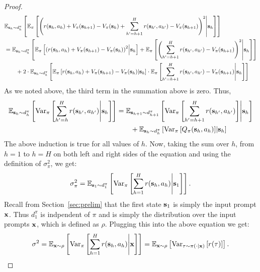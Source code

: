 \begin{proof}
\begin{align*}
    & \mathbb{E}_{\mathbf{s}_h \sim d^{\pi}_{h}}\left [ \mathbb{E}_{\pi}\left [ \left( r(\mathbf{s}_h, a_h) + V_\pi(\mathbf{s}_{h+1}) - V_\pi(\mathbf{s}_h) + \sum_{h^\prime = h+1}^H r(\mathbf{s}_{h^\prime}, a_{h^\prime}) - V_\pi(\mathbf{s}_{h+1}) \right)^2 \middle| \mathbf{s}_h \right ] \right ] \\
    &=   \mathbb{E}_{\mathbf{s}_h \sim d^{\pi}_{h}}\left [ \mathbb{E}_{\pi}\left [ \left( r(\mathbf{s}_h, a_h) + V_\pi(\mathbf{s}_{h+1}) - V_\pi(\mathbf{s}_h) \right)^2 \middle| \mathbf{s}_h \right ] + \mathbb{E}_{\pi} \left [ \left(  \sum_{h^\prime = h+1}^H r(\mathbf{s}_{h^\prime}, a_{h^\prime}) - V_\pi(\mathbf{s}_{h+1}) \right)^2 \middle| \mathbf{s}_h \right ] \right ] \\ 
    &\quad\quad + 2\cdot \mathbb{E}_{\mathbf{s}_h \sim d^{\pi}_{h}}\left [ \mathbb{E}_{\pi}\left [ {r(\mathbf{s}_h, a_h) + V_\pi(\mathbf{s}_{h+1}) - V_\pi(\mathbf{s}_h)} \middle| \mathbf{s}_h \right ] \cdot \mathbb{E}_{\pi} \left [ { \sum_{h^\prime = h+1}^H r(\mathbf{s}_{h^\prime}, a_{h^\prime}) - V_\pi(\mathbf{s}_{h+1})} \middle| \mathbf{s}_h \right ] \right ]  
\end{align*}
As we noted above, the third term in the summation above is zero. Thus,
\begin{align*}
    \mathbb{E}_{\mathbf{s}_h \sim d^\pi_h} \left [ \mathrm{Var}_\pi \left [  \sum_{h^\prime=h}^H r(\mathbf{s}_{h^\prime}, a_{h^\prime}) \middle| \mathbf{s}_h \right ] \right ] &= \mathbb{E}_{\mathbf{s}_{h+1} \sim d^\pi_{h+1}}\left [  \mathrm{Var}_\pi \left [  \sum_{h^\prime=h+1}^H r(\mathbf{s}_{h^\prime}, a_{h^\prime}) \right ] \middle| \mathbf{s}_h \right ] \\  
    & \quad\quad + \mathbb{E}_{\mathbf{s}_{h} \sim d^\pi_h} \left [  \mathrm{Var}_\pi \left [ Q_\pi (\mathbf{s}_h, a_h) \right ] \middle| \mathbf{s}_h \right ]   
\end{align*}
The above induction is true for all values of $h$.
Now, taking the sum over $h$, from $h=1$ to $h=H$ on both left and right sides of the equation and using the definition of $\sigma^2_\pi$, we get:
\begin{align*}
    \sigma_\pi^2 = \mathbb{E}_{\mathbf{s}_1 \sim d^\pi_1} \left[ \mathrm{Var}_{\pi} \left [ \sum_{h=1}^H r(\mathbf{s}_h, a_h) \middle| \mathbf{s}_1 \right ] \right].  
\end{align*}
Recall from Section~\ref{sec:prelim} that the first state $\mathbf{s}_1$ is simply the input prompt $\mathbf{x}$. Thus $d_1^\pi$ is indpendent of $\pi$ and is simply the distribution over the input prompts $\mathbf{x}$, which is defined as $\rho$. Plugging this into the above equation we get:
\begin{align*}
    \sigma^2 = \mathbb{E}_{\mathbf{x} \sim \rho} \left[ \mathrm{Var}_{\pi} \left [ \sum_{h=1}^H r(\mathbf{s}_h, a_h) \middle| \mathbf{x} \right ] \right] = \mathbb{E}_{\mathbf{x} \sim \rho} \left[ \mathrm{Var}_{\tau \sim \pi(\cdot \mid \mathbf{x})} \left [ r(\tau) \right ] \right].  
\end{align*}
\end{proof}


